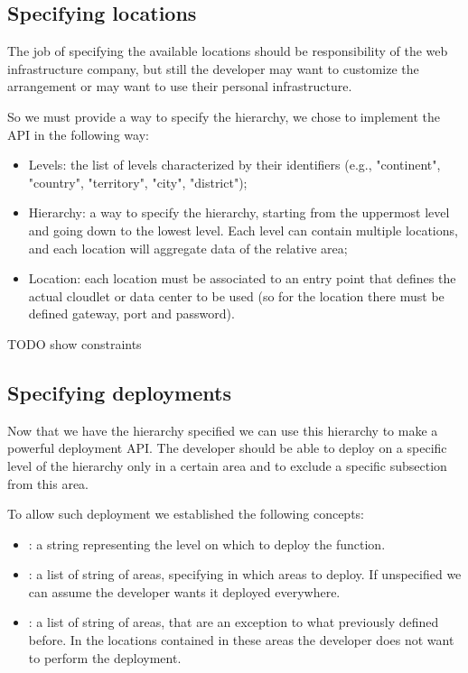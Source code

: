 \subsection{Specifying locations}
The job of specifying the available locations should be responsibility of the web infrastructure company, but still the developer may want to customize the arrangement or may want to use their personal infrastructure. 

So we must provide a way to specify the hierarchy, we chose to implement the API in the following way:
\begin{itemize}
    \item Levels: the list of levels characterized by their identifiers (e.g., "continent", "country", "territory", "city", "district");
    \item Hierarchy: a way to specify the hierarchy, starting from the uppermost level and going down to the lowest level. Each level can contain multiple locations, and each location will aggregate data of the relative area;
    \item Location: each location must be associated to an entry point that defines the actual cloudlet or data center to be used (so for the location there must be defined gateway, port and password).
\end{itemize}

TODO show constraints


\subsection{Specifying deployments}
Now that we have the hierarchy specified we can use this hierarchy to make a powerful deployment API. The developer should be able to deploy on a specific level of the hierarchy only in a certain area and to exclude a specific subsection from this area.

To allow such deployment we established the following concepts:
\begin{itemize}
    \item {}: a string representing the level on which to deploy the function.
    \item {}: a list of string of areas, specifying in which areas to deploy. If unspecified we can assume the developer wants it deployed everywhere. 
     \item {}: a list of string of areas, that are an exception to what previously defined before. In the locations contained in these areas the developer does not want to perform the deployment.
\end{itemize}


